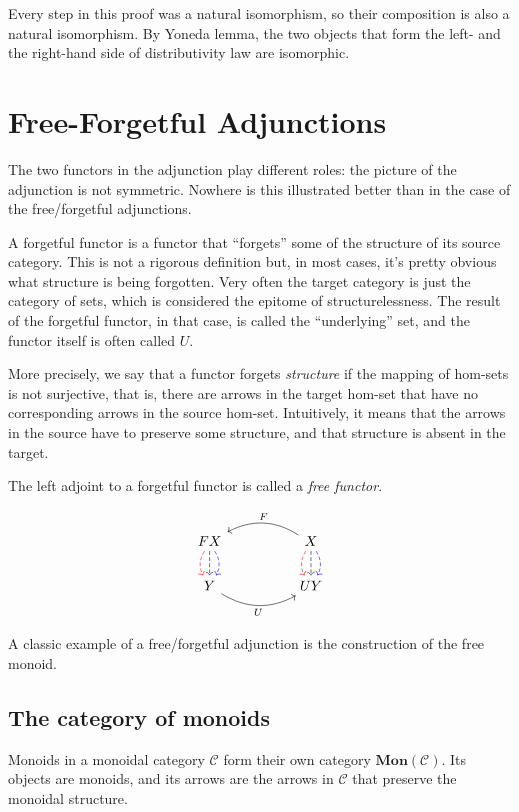 \documentclass[DaoFP]{subfiles}
\begin{document}
Every step in this proof was a natural isomorphism, so their composition is also a natural isomorphism. By Yoneda lemma, the two objects that form the left- and the right-hand side of distributivity law are isomorphic.

\section{Free-Forgetful Adjunctions}
The two functors in the adjunction play different roles: the picture of the adjunction is not symmetric. Nowhere is this illustrated better than in the case of the free/forgetful adjunctions. 

A forgetful functor is a functor that ``forgets'' some of the structure of its source category. This is not a rigorous definition but, in most cases, it's pretty obvious what structure is being forgotten. Very often the target category is just the category of sets, which is considered the epitome of structurelessness. The result of the forgetful functor, in that case, is called the ``underlying'' set, and the functor itself is often called $U$. 

More precisely, we say that a functor forgets \emph{structure} if the mapping of hom-sets is not surjective, that is, there are arrows in the target hom-set that have no corresponding arrows in the source hom-set. Intuitively, it means that the arrows in the source have to preserve some structure, and that structure is absent in the target. 

The left adjoint to a forgetful functor is called a \emph{free functor}.

\[
 \begin{tikzcd}
F X
\arrow[d, bend right, red, dashed]
\arrow[d, dashed]
\arrow[d, bend left, blue, dashed]
  &&
  X
\arrow[d, bend right, red, dashed]
\arrow[d, dashed]
\arrow[d, bend left, blue, dashed]
 \arrow[ll, bend right, "F"']
 \\
Y
   \arrow[rr, bend right, "U"']
 &&
 U Y
  \end{tikzcd}
\]

A classic example of a free/forgetful adjunction is the construction of the free monoid.


\subsection{The category of monoids}
Monoids in a monoidal category $\mathcal{C}$ form their own category $\mathbf{Mon}(\mathcal{C})$. Its objects are monoids, and its arrows are the arrows in $\mathcal{C}$ that preserve the monoidal structure. 
\end{document}
